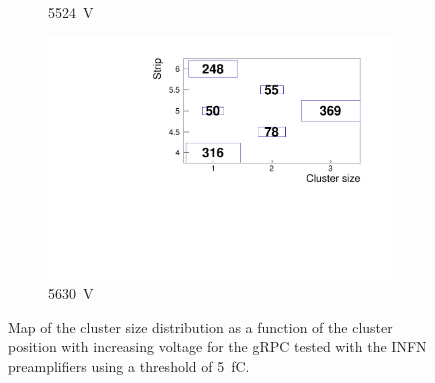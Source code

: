 \begin{figure}[H]
\begin{subfigure}{.33\linewidth}
			\caption{\label{fig:cluster-size-2D:E} \SI{5524}{V}}
		\end{subfigure}
		\begin{subfigure}{.33\linewidth}
		    \centering
			\includegraphics[width=1.1\linewidth]{fig/chapt6/Muon-ClS-5500-gRPC-INFN.pdf}
			\caption{\label{fig:cluster-size-2D:F} \SI{5630}{V}}
		\end{subfigure}
		\caption{\label{fig:cluster-size-2D} Map of the cluster size distribution as a function of the cluster position with increasing voltage for the gRPC tested with the INFN preamplifiers using a threshold of \SI{5}{fC}.}
	\end{figure}
    
